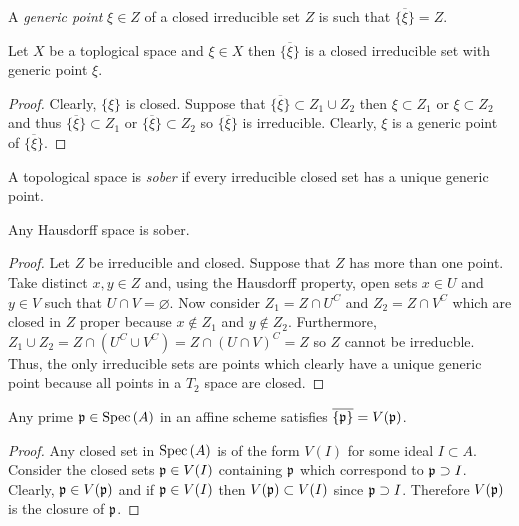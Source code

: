 \documentclass[12pt]{article}
\begin{document}
\begin{definition}
A \textit{generic point} $\xi \in Z$ of a closed irreducible set $Z$ is such that $\overline{\{ \xi \} } = Z$. 
\end{definition}

\begin{proposition}
Let $X$ be a toplogical space and $\xi \in X$ then $\overline{\{ \xi \} }$ is a closed irreducible set with generic point $\xi$. 
\end{proposition}

\begin{proof}
Clearly, $\{ \xi \}$ is closed. Suppose that $\overline{\{ \xi \}} \subset Z_1 \cup Z_2$ then $\xi \subset Z_1$ or $\xi \subset Z_2$ and thus $\overline{\{ \xi \} } \subset Z_1$ or $\overline{\{ \xi \} } \subset Z_2$ so $\overline{\{ \xi \}}$ is irreducible. Clearly, $\xi$ is a generic point of $\overline{\{ \xi \}}$. 
\end{proof}

\begin{definition}
A topological space is \textit{sober} if every irreducible closed set has a unique generic point. 
\end{definition}

\begin{proposition}
Any Hausdorff space is sober.
\end{proposition}

\begin{proof}
Let $Z$ be irreducible and closed. Suppose that $Z$ has more than one point. Take distinct $x, y \in Z$ and, using the Hausdorff property, open sets $x \in U$ and $y \in V$ such that $U \cap V = \varnothing$. Now consider $Z_1 = Z \cap U^C$ and $Z_2 = Z \cap V^C$ which are closed in $Z$ proper because $x \notin Z_1$ and $y \notin Z_2$. Furthermore, $Z_1 \cup Z_2 = Z \cap (U^C \cup V^C) = Z \cap (U \cap V)^C = Z$ so $Z$ cannot be irreducble. Thus, the only irreducible sets are points which clearly have a unique generic point because all points in a $T_2$ space are closed.
\end{proof}

\begin{lemma}
Any prime $\mathfrak{p} \in \mathrm{Spec}\left( A \right)$ in an affine scheme satisfies $\overline{\{\mathfrak{p}\}} = V(\mathfrak{p})$. 
\end{lemma}

\begin{proof}
Any closed set in $\mathrm{Spec}\left( A \right)$ is of the form $V(I)$ for some ideal $I \subset A$. Consider the closed sets $\mathfrak{p} \in V(I)$ containing $\mathfrak{p}$ which correspond to $\mathfrak{p} \supset I$. Clearly, $\mathfrak{p} \in V(\mathfrak{p})$ and if $\mathfrak{p} \in V(I)$ then $V(\mathfrak{p}) \subset V(I)$ since $\mathfrak{p} \supset I$. Therefore $V(\mathfrak{p})$ is the closure of $\mathfrak{p}$.
\end{proof}
\end{document}
